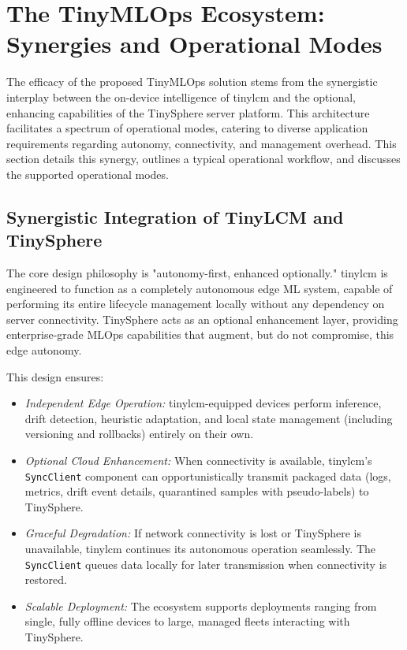 \section{The TinyMLOps Ecosystem: Synergies and Operational Modes}
\label{sec:ecosystem_synergies_modes}

The efficacy of the proposed TinyMLOps solution stems from the synergistic interplay between the on-device intelligence of \gls{tinylcm} and the optional, enhancing capabilities of the TinySphere server platform. This architecture facilitates a spectrum of operational modes, catering to diverse application requirements regarding autonomy, connectivity, and management overhead. This section details this synergy, outlines a typical operational workflow, and discusses the supported operational modes.


\subsection{Synergistic Integration of TinyLCM and TinySphere}
\label{ssec:ecosystem_integration_philosophy}


The core design philosophy is "autonomy-first, enhanced optionally." \gls{tinylcm} is engineered to function as a completely autonomous edge ML system, capable of performing its entire lifecycle management locally without any dependency on server connectivity. TinySphere acts as an optional enhancement layer, providing enterprise-grade MLOps capabilities that augment, but do not compromise, this edge autonomy.

This design ensures:
\begin{itemize}[noitemsep, topsep=0pt]
    \item \textit{Independent Edge Operation:} \gls{tinylcm}-equipped devices perform inference, drift detection, heuristic adaptation, and local state management (including versioning and rollbacks) entirely on their own.
    \item \textit{Optional Cloud Enhancement:} When connectivity is available, \gls{tinylcm}'s \texttt{SyncClient} component can opportunistically transmit packaged data (logs, metrics, drift event details, quarantined samples with pseudo-labels) to TinySphere.
    \item \textit{Graceful Degradation:} If network connectivity is lost or TinySphere is unavailable, \gls{tinylcm} continues its autonomous operation seamlessly. The \texttt{SyncClient} queues data locally for later transmission when connectivity is restored.
    \item \textit{Scalable Deployment:} The ecosystem supports deployments ranging from single, fully offline devices to large, managed fleets interacting with TinySphere.
\end{itemize}

